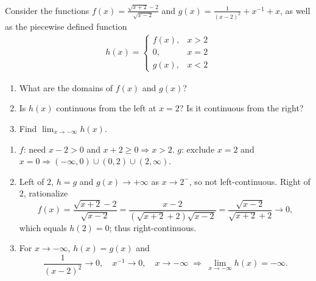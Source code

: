 \documentclass[11pt]{exam}
\begin{document}
\begin{questions}
\question[2]
    Consider the functions $f(x) = \frac{\sqrt{x+2} - 2}{\sqrt{x - 2}}$ and $g(x) = \frac{1}{(x - 2)^2} + x^{-1} + x$, as well as the piecewise defined function
    \begin{align*}
        h(x) =
        \begin{cases}
            f(x), & x > 2 \\
            0, & x = 2 \\
            g(x), & x < 2
        \end{cases}
    \end{align*}

    \begin{enumerate}[leftmargin = 0.5cm, label = (\alph*), rightmargin = 0.2cm]
        
        \item What are the domains of $f(x)$ and $g(x)$?

        \item Is $h(x)$ continuous from the left at $x = 2$? Is it continuous from the right?

        \item Find $\lim_{x\rightarrow-\infty} h(x)$.
        
    \end{enumerate}
    
\begin{solution}[0cm]
    \begin{enumerate}[leftmargin = 0.5cm, label = (\alph*), rightmargin = 0.2cm]
        \item $f$: need $x-2>0$ and $x+2\ge0\Rightarrow x>2$.  
              $g$: exclude $x=2$ and $x=0\Rightarrow(-\infty,0)\cup(0,2)\cup(2,\infty)$.
        \item Left of $2$, $h=g$ and $g(x)\to+\infty$ as $x\to2^-$, so not left-continuous.  
              Right of $2$, rationalize
              \[
              f(x)=\frac{\sqrt{x+2}-2}{\sqrt{x-2}}
              =\frac{x-2}{(\sqrt{x+2}+2)\sqrt{x-2}}
              =\frac{\sqrt{x-2}}{\sqrt{x+2}+2}\to 0,
              \]
              which equals $h(2)=0$; thus right-continuous.
        \item For $x\to-\infty$, $h(x)=g(x)$ and
              \[
              \frac{1}{(x-2)^2}\to0,\quad x^{-1}\to0,\quad x\to-\infty \;\Rightarrow\; \lim_{x\to-\infty}h(x)=-\infty.
              \]
    \end{enumerate}
\end{solution}


\end{questions}
\end{document}
